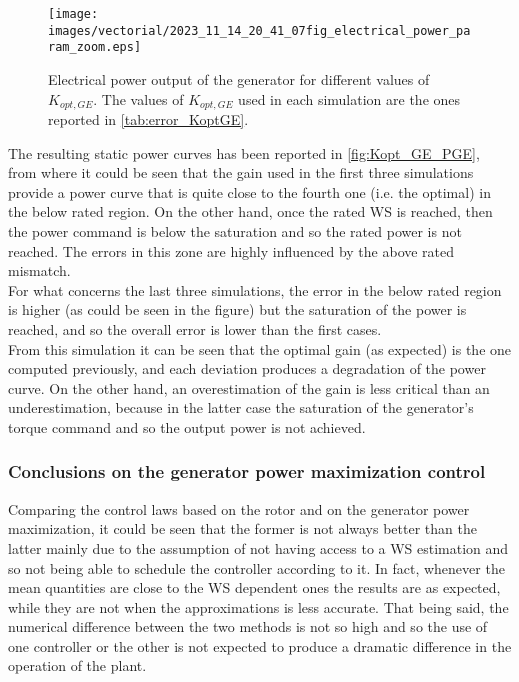\begin{figure}[!htbp]
  \centering
  \texttt{[image: images/vectorial/2023\_11\_14\_20\_41\_07fig\_electrical\_power\_param\_zoom.eps]}
  \caption{Electrical power output of the generator for different values of $K_{opt,GE}$. The values of $K_{opt,GE}$ used in each simulation are the ones reported in \autoref{tab:error_KoptGE}.}
  \label{fig:Kopt_GE_PGE}
\end{figure}

The resulting static power curves has been reported in \autoref{fig:Kopt_GE_PGE}, from where it could be seen that the gain used in the first three simulations provide a power curve that is quite close to the fourth one (i.e. the optimal) in the below rated region. On the other hand, once the rated WS is reached, then the power command is below the saturation and so the rated power is not reached. The errors in this zone are highly influenced by the above rated mismatch. \\
For what concerns the last three simulations, the error in the below rated region is higher (as could be seen in the figure) but the saturation of the power is reached, and so the overall error is lower than the first cases. \\
From this simulation it can be seen that the optimal gain (as expected) is the one computed previously, and each deviation produces a degradation of the power curve. On the other hand, an overestimation of the gain is less critical than an underestimation, because in the latter case the saturation of the generator's torque command and so the output power is not achieved.

\subsubsection{Conclusions on the generator power maximization control}
Comparing the control laws based on the rotor and on the generator power maximization, it could be seen that the former is not always better than the latter mainly due to the assumption of not having access to a WS estimation and so not being able to schedule the controller according to it. In fact, whenever the mean quantities are close to the WS dependent ones the results are as expected, while they are not when the approximations is less accurate. That being said, the numerical difference between the two methods is not so high and so the use of one controller or the other is not expected to produce a dramatic difference in the operation of the plant.  


